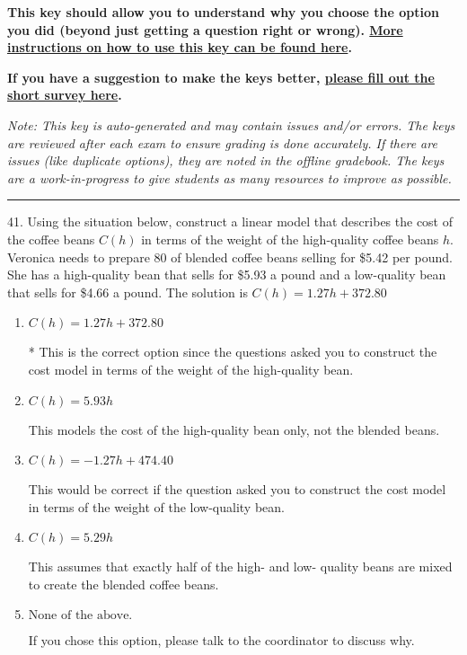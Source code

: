 \documentclass{extbook}[14pt]
\begin{document}
\textbf{This key should allow you to understand why you choose the option you did (beyond just getting a question right or wrong). \href{https://xronos.clas.ufl.edu/mac1105spring2020/courseDescriptionAndMisc/Exams/LearningFromResults}{More instructions on how to use this key can be found here}.}

\textbf{If you have a suggestion to make the keys better, \href{https://forms.gle/CZkbZmPbC9XALEE88}{please fill out the short survey here}.}

\textit{Note: This key is auto-generated and may contain issues and/or errors. The keys are reviewed after each exam to ensure grading is done accurately. If there are issues (like duplicate options), they are noted in the offline gradebook. The keys are a work-in-progress to give students as many resources to improve as possible.}

\rule{\textwidth}{0.4pt}

41. Using the situation below, construct a linear model that describes the cost of the coffee beans $C(h)$ in terms of the weight of the high-quality coffee beans $h$.
Veronica needs to prepare 80 of blended coffee beans selling for \$5.42 per pound. She has a high-quality bean that sells for \$5.93 a pound and a low-quality bean that sells for \$4.66 a pound. 
The solution is $ C(h) = 1.27 h + 372.80 $ 

\begin{enumerate}[label=\Alph*.] 
\item $ C(h) = 1.27 h + 372.80 $ 

 * This is the correct option since the questions asked you to construct the cost model in terms of the weight of the high-quality bean. 
\item $ C(h) = 5.93 h $ 

 This models the cost of the high-quality bean only, not the blended beans. 
\item $ C(h) = -1.27 h + 474.40 $ 

 This would be correct if the question asked you to construct the cost model in terms of the weight of the low-quality bean. 
\item $ C(h) = 5.29 h $ 

 This assumes that exactly half of the high- and low- quality beans are mixed to create the blended coffee beans. 
\item $ \text{None of the above.} $ 

 If you chose this option, please talk to the coordinator to discuss why. 
\end{enumerate} 
 
\end{document}
